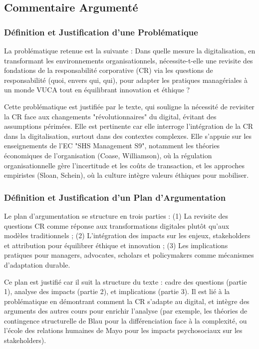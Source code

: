 \documentclass{rapportECL}
\begin{document}
\subsection{Commentaire Argumenté}

\subsubsection{Définition et Justification d’une Problématique}
La problématique retenue est la suivante : Dans quelle mesure la digitalisation, en transformant les environnements organisationnels, nécessite-t-elle une revisite des fondations de la responsabilité corporative (CR) via les questions de responsabilité (quoi, envers qui, qui), pour adapter les pratiques managériales à un monde VUCA tout en équilibrant innovation et éthique ?

Cette problématique est justifiée par le texte, qui souligne la nécessité de revisiter la CR face aux changements "révolutionnaires" du digital, évitant des assumptions périmées. Elle est pertinente car elle interroge l'intégration de la CR dans la digitalisation, surtout dans des contextes complexes. Elle s’appuie sur les enseignements de l’EC "SHS Management S9", notamment les théories économiques de l'organisation (Coase, Williamson), où la régulation organisationnelle gère l'incertitude et les coûts de transaction, et les approches empiristes (Sloan, Schein), où la culture intègre valeurs éthiques pour mobiliser.

\subsubsection{Définition et Justification d’un Plan d’Argumentation}
Le plan d’argumentation se structure en trois parties : (1) La revisite des questions CR comme réponse aux transformations digitales plutôt qu'aux modèles traditionnels ; (2) L'intégration des impacts sur les enjeux, stakeholders et attribution pour équilibrer éthique et innovation ; (3) Les implications pratiques pour managers, advocates, scholars et policymakers comme mécanismes d'adaptation durable.

Ce plan est justifié car il suit la structure du texte : cadre des questions (partie 1), analyse des impacts (partie 2), et implications (partie 3). Il est lié à la problématique en démontrant comment la CR s'adapte au digital, et intègre des arguments des autres cours pour enrichir l'analyse (par exemple, les théories de contingence structurelle de Blau pour la différenciation face à la complexité, ou l'école des relations humaines de Mayo pour les impacts psychosociaux sur les stakeholders).
\end{document}

